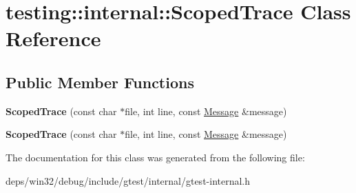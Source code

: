 \hypertarget{classtesting_1_1internal_1_1_scoped_trace}{}\section{testing\+:\+:internal\+:\+:Scoped\+Trace Class Reference}
\label{classtesting_1_1internal_1_1_scoped_trace}
\subsection*{Public Member Functions}
\begin{DoxyCompactItemize}
\item 
\hypertarget{classtesting_1_1internal_1_1_scoped_trace_ab965d7010bbbc82c1bef6ebf8748bede}{}{\bfseries Scoped\+Trace} (const char $\ast$file, int line, const \hyperlink{classtesting_1_1_message}{Message} \&message)\label{classtesting_1_1internal_1_1_scoped_trace_ab965d7010bbbc82c1bef6ebf8748bede}

\item 
\hypertarget{classtesting_1_1internal_1_1_scoped_trace_ab965d7010bbbc82c1bef6ebf8748bede}{}{\bfseries Scoped\+Trace} (const char $\ast$file, int line, const \hyperlink{classtesting_1_1_message}{Message} \&message)\label{classtesting_1_1internal_1_1_scoped_trace_ab965d7010bbbc82c1bef6ebf8748bede}

\end{DoxyCompactItemize}


The documentation for this class was generated from the following file\+:\begin{DoxyCompactItemize}
\item 
deps/win32/debug/include/gtest/internal/gtest-\/internal.\+h\end{DoxyCompactItemize}
